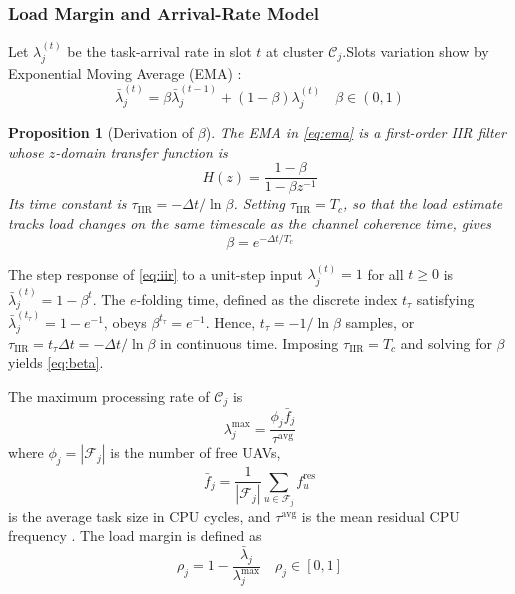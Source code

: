\documentclass[journal]{IEEEtran}
\newtheorem{proposition}{Proposition}
\begin{document}
\subsubsection{Load Margin and Arrival-Rate Model}

Let $\lambda_{j}^{(t)}$ be the task-arrival rate in slot $t$ at cluster
$\mathcal{C}_{j}$.Slots variation show by Exponential Moving Average (EMA)
\cite{ref14}:
\begin{equation}
  \bar{\lambda}_{j}^{(t)}=
  \beta\bar{\lambda}_{j}^{(t-1)}+(1-\beta)\lambda_{j}^{(t)}
  \quad \beta\in(0,1)
  \label{eq:ema}
\end{equation}

\begin{proposition}[Derivation of $\beta$]
\label{prop:beta}
The EMA in \eqref{eq:ema} is a first-order IIR filter whose $z$-domain
transfer function is
\begin{equation}
  H(z)=\frac{1-\beta}{1-\beta z^{-1}} 
  \label{eq:iir}
\end{equation}
Its time constant is $\tau_{\mathrm{IIR}}=-\Delta t/\ln\beta$. Setting
$\tau_{\mathrm{IIR}}=T_{c}$, so that the load estimate tracks load changes
on the same timescale as the channel coherence time, gives
\begin{equation}
  \beta=e^{-\Delta t/T_{c}} 
  \label{eq:beta}
\end{equation}
\end{proposition}

\begin{IEEEproof}
The step response of \eqref{eq:iir} to a unit-step input
$\lambda_{j}^{(t)}=1$ for all $t\geq0$ is
$\bar{\lambda}_{j}^{(t)}=1-\beta^{t}$. The $e$-folding time, defined as the
discrete index $t_{\tau}$ satisfying
$\bar{\lambda}_{j}^{(t_{\tau})}=1-e^{-1}$, obeys
$\beta^{t_{\tau}}=e^{-1}$. Hence, $t_{\tau}=-1/\ln\beta$ samples, or
$\tau_{\mathrm{IIR}}=t_{\tau}\Delta t=-\Delta t/\ln\beta$ in continuous
time. Imposing $\tau_{\mathrm{IIR}}=T_{c}$ and solving for $\beta$ yields
\eqref{eq:beta}.
\end{IEEEproof}

The maximum processing rate of $\mathcal{C}_{j}$ is
\begin{equation}
  \lambda_{j}^{\max}=\frac{\phi_{j}\bar{f}_{j}}{\tau^{\mathrm{avg}}}
  \label{eq:lambda_max}
\end{equation}
where $\phi_{j}=|\mathcal{F}_{j}|$ is the number of free UAVs,
\begin{equation}
  \bar{f}_{j}=\frac{1}{|\mathcal{F}_{j}|}
  \sum_{u\in\mathcal{F}_{j}}f_{u}^{\mathrm{res}}
\end{equation}
is the average task size in CPU cycles, and $\tau^{\mathrm{avg}}$ is the
mean residual CPU frequency \cite{chen2023drl,wang2023joint}. The load
margin is defined as
\begin{equation}
  \rho_{j}=1-\frac{\bar{\lambda}_{j}}{\lambda_{j}^{\max}}
  \quad \rho_{j}\in[0,1]
  \label{eq:load_margin}
\end{equation}
\end{document}
